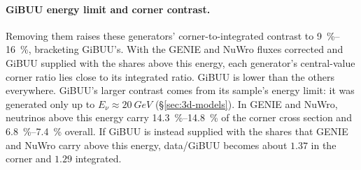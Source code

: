 \paragraph{GiBUU energy limit and corner contrast.} Removing them raises these generators' corner-to-integrated contrast to \SIrange{9}{16}{\percent}, bracketing GiBUU's. With the GENIE and NuWro fluxes corrected and GiBUU supplied with the shares above this energy, each generator's central-value corner ratio lies close to its integrated ratio. GiBUU is lower than the others everywhere. GiBUU's larger contrast comes from its sample's energy limit: it was generated only up to $E_\nu\approx\SI{20}{GeV}$ (\S\ref{sec:3d-models}). In GENIE and NuWro, neutrinos above this energy carry \SIrange{14.3}{14.8}{\percent} of the corner cross section and \SIrange{6.8}{7.4}{\percent} overall. If GiBUU is instead supplied with the shares that GENIE and NuWro carry above this energy, data/GiBUU becomes about $1.37$ in the corner and $1.29$ integrated.

